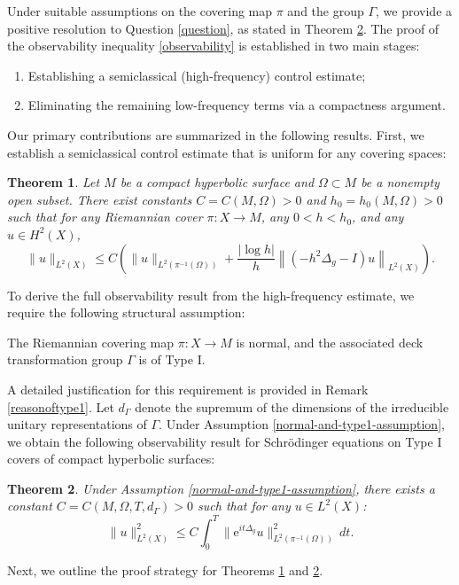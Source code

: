 \documentclass[11pt,oneside,reqno]{amsart}
\newtheorem{theorem}{Theorem}[section]
\theoremstyle{definition}
\numberwithin{equation}{section}
\theoremstyle{plain}
\newenvironment{assumption}[1]{
  \renewcommand\theassumptionalt{#1}
  \assumptionalt
}{\endassumptionalt}
\begin{document}
Under suitable assumptions on the covering map $\pi$ and the group $\Gamma$, we provide a positive resolution to Question \ref{question}, as stated in Theorem \ref{thm-main-obs}. The proof of the observability inequality \eqref{observability} is established in two main stages:
\begin{enumerate}
    \item Establishing a semiclassical (high-frequency) control estimate; \label{step1}
    \item Eliminating the remaining low-frequency terms via a compactness argument.
\end{enumerate}

Our primary contributions are summarized in the following results. First, we establish a semiclassical control estimate that is uniform for any covering spaces:

\begin{theorem}\label{highfrequencycontrol}
    Let $M$ be a compact hyperbolic surface and $\Omega \subset M$ be a nonempty open subset. 
    There exist constants $C = C(M, \Omega) > 0$ and $h_0 = h_0(M, \Omega) > 0$ such that for any Riemannian cover $\pi: X \to M$, any $0 < h < h_0$, and any $u \in H^2(X)$,
    \begin{equation*}
        \|u\|_{L^2(X)} \leq C\left(\|u\|_{L^2\left(\pi^{-1}(\Omega)\right)} + \frac{|\log h|}{h}\left\|\left(-h^2 \Delta_g - I\right) u\right\|_{L^2(X)}\right).
    \end{equation*}
\end{theorem}

To derive the full observability result from the high-frequency estimate, we require the following structural assumption:

\begin{assumption}{H}\label{normal-and-type1-assumption}
    The Riemannian covering map $\pi: X \rightarrow M$ is normal, and the associated deck transformation group $\Gamma$ is of Type I.
\end{assumption}

A detailed justification for this requirement is provided in Remark \ref{reasonoftype1}. Let $d_{\Gamma}$ denote the supremum of the dimensions of the irreducible unitary representations of $\Gamma$. Under Assumption \ref{normal-and-type1-assumption}, we obtain the following observability result for Schrödinger equations on Type I covers of compact hyperbolic surfaces:

\begin{theorem}\label{thm-main-obs}
    Under Assumption \ref{normal-and-type1-assumption}, there exists a constant $C = C(M, \Omega, T, d_\Gamma) > 0$ such that for any $u \in L^2(X)$:
    \begin{equation*}
        \|u\|_{L^2(X)}^2 \leq C \int_{0}^{T}\|\mathrm{e}^{it \Delta_g}u\|^2_{L^2(\pi^{-1}(\Omega))} \, dt.
    \end{equation*}
\end{theorem}
Next, we outline the proof strategy for Theorems \ref{highfrequencycontrol} and \ref{thm-main-obs}.
\end{document}
